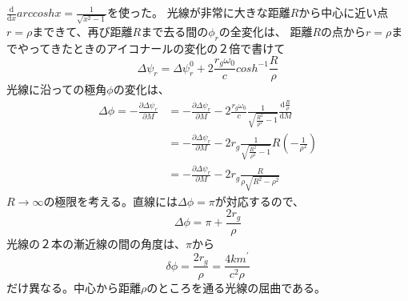 \documentclass{jsarticle}
\newcommand{\pder}[2][]{\frac{\partial#1}{\partial#2}}
\newcommand{\dder}[2][]{\frac{\mathrm{d}#1}{\mathrm{d}#2}}
\newcommand{\beq}{\begin{equation}}
\newcommand{\eeq}{\end{equation}}
\begin{document}
$\dder[]{x}arccoshx = \frac{1}{\sqrt{x^2 - 1}}$を使った。
光線が非常に大きな距離$R$から中心に近い点$r=\rho$まできて、再び距離$R$まで去る間の$\phi_r$の全変化は、
距離$R$の点から$r=\rho$までやってきたときのアイコナールの変化の２倍で書けて
\beq
\Delta \psi_r = \Delta \psi_r^0 + 2 \frac{r_g \omega_0}{c}cosh^{-1}\frac{R}{\rho}
\eeq
光線に沿っての極角$\phi$の変化は、
\begin{align}
    \Delta \phi = - \pder[\Delta \psi_r]{M} &= - \pder[\Delta \psi_r]{M} - 
    2 \frac{r_g \omega_0}{c} \frac{1}{\sqrt{\frac{R^2}{\rho^2} - 1}} \dder[\frac{R}{\rho}]{M}\\
                                            &= - \pder[\Delta \psi_r]{M} - 2 r_g \frac{1}{\sqrt{\frac{R^2}{\rho^2} - 1}} R (-\frac{1}{\rho^2})\\
                                                             &= - \pder[\Delta \psi_r]{M} - 2 r_g \frac{R}{\rho\sqrt{R^2 - \rho^2}}
\end{align}
$R \rightarrow \infty$の極限を考える。直線には$\Delta \phi = \pi$が対応するので、
\beq
    \Delta \phi = \pi + \frac{2r_g}{\rho}
\eeq
光線の２本の漸近線の間の角度は、$\pi$から
\beq
    \delta \phi = \frac{2r_g}{\rho} = \frac{4km^\prime}{c^2\rho}
\eeq
だけ異なる。中心から距離$\rho$のところを通る光線の屈曲である。
\end{document}
